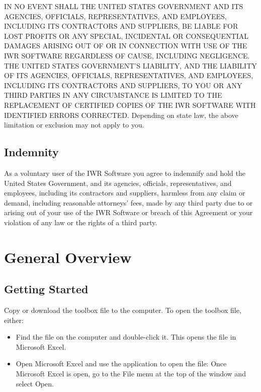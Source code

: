 \documentclass[
]{book}
\begin{document}
IN NO EVENT SHALL THE UNITED STATES GOVERNMENT AND ITS AGENCIES, OFFICIALS, REPRESENTATIVES, AND EMPLOYEES, INCLUDING ITS CONTRACTORS AND SUPPLIERS, BE LIABLE FOR LOST PROFITS OR ANY SPECIAL, INCIDENTAL OR CONSEQUENTIAL DAMAGES ARISING OUT OF OR IN CONNECTION WITH USE OF THE IWR SOFTWARE REGARDLESS OF CAUSE, INCLUDING NEGLIGENCE. THE UNITED STATES GOVERNMENT'S LIABILITY, AND THE LIABILITY OF ITS AGENCIES, OFFICIALS, REPRESENTATIVES, AND EMPLOYEES, INCLUDING ITS CONTRACTORS AND SUPPLIERS, TO YOU OR ANY THIRD PARTIES IN ANY CIRCUMSTANCE IS LIMITED TO THE REPLACEMENT OF CERTIFIED COPIES OF THE IWR SOFTWARE WITH IDENTIFIED ERRORS CORRECTED. Depending on state law, the above limitation or exclusion may not apply to you.

\section{Indemnity}\label{indemnity}

As a voluntary user of the IWR Software you agree to indemnify and hold the United States Government, and its agencies, officials, representatives, and employees, including its contractors and suppliers, harmless from any claim or demand, including reasonable attorneys' fees, made by any third party due to or arising out of your use of the IWR Software or breach of this Agreement or your violation of any law or the rights of a third party.

\chapter{General Overview}\label{general-overview}

\section{Getting Started}\label{getting-started}

Copy or download the toolbox file to the computer. To open the toolbox file, either:

\begin{itemize}
\item
  Find the file on the computer and double-click it. This opens the file in Microsoft Excel.
\item
  Open Microsoft Excel and use the application to open the file: Once Microsoft Excel is open, go to the File menu at the top of the window and select Open.
\end{itemize}
\end{document}
